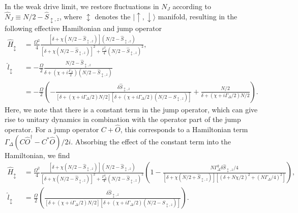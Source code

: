\documentclass[11pt]{article}
\begin{document}
In the weak drive limit, we restore fluctuations in $N_J$ according to $\hat{N}_J \equiv N/2 - \hat{S}_{\updownarrow,z}$, where $\updownarrow$ denotes the $|{\uparrow},{\downarrow}\rangle$ manifold, resulting in the following effective Hamiltonian and jump operator
\begin{equation}
\begin{aligned}
    \hat H_{\updownarrow} &~= \frac{\Omega^2}{4} \frac{[\delta+\chi  (N/2-\hat{S}_{\updownarrow,z})] (N/2-\hat{S}_{\updownarrow,z})}{[\delta+\chi  (N/2-\hat{S}_{\updownarrow,z})]^2+\frac{\Gamma_\Delta^2}{4} (N/2-\hat{S}_{\updownarrow,z})^2}, \\
    \hat l_{\updownarrow} &~= -\frac{\Omega}{2}\frac{N/2-\hat{S}_{\updownarrow,z}}{\delta +(\chi + i \frac{\Gamma_\Delta}{2}) (N/2-\hat{S}_{\updownarrow,z})}
    \\ &~ = -\frac{\Omega}{2} \left( -\frac{\delta \hat{S}_{\updownarrow,z}}{[\delta + (\chi + i \Gamma_\Delta/2) N/2][ \delta + (\chi + i \Gamma_\Delta/2) (N/2 - S_{\updownarrow,z})]}  + \frac{N/2}{\delta + (\chi + i \Gamma_\Delta/2)N/2}\right).
\end{aligned}
\end{equation}
Here, we note that there is a constant term in the jump operator, which can give rise to unitary dynamics in combination with the operator part of the jump operator. For a jump operator $C + \hat O$, this corresponds to a Hamiltonian term $\Gamma_\Delta (C \hat O^\dagger - C^* \hat O)/2i$. Absorbing the effect of the constant term into the Hamiltonian, we find
\begin{subequations}
\begin{align}
    \hat H_{\updownarrow} &~ = \frac{\Omega^2}{4} \frac{[\delta+\chi  (N/2-\hat{S}_{\updownarrow,z})] (N/2-\hat{S}_{\updownarrow,z})}{[\delta+\chi  (N/2-\hat{S}_{\updownarrow,z})]^2+\frac{\Gamma_\Delta^2}{4} (N/2-\hat{S}_{\updownarrow,z})^2}\left(1 - \frac{N \Gamma_\Delta^2 \delta \hat S_{\updownarrow,z} /4 }{[\delta+ \chi (N/2+\hat S_{\updownarrow,z})] [ (\delta +N \chi/2)^2 + (N \Gamma_\Delta/4)^2] }\right),\\
    \hat l_{\updownarrow} &~ = \frac{\Omega}{2} \left( \frac{\delta \hat{S}_{\updownarrow,z}}{[\delta + (\chi + i \Gamma_\Delta/2) N/2][ \delta + (\chi + i \Gamma_\Delta/2) (N/2 - S_{\updownarrow,z})]}\right).
\end{align}
\end{subequations}
\end{document}
